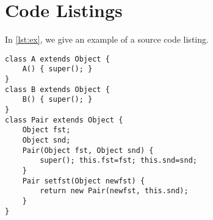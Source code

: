 \section{Code Listings}

In \vref{lst:ex}, we give an example of a source code listing. 

\begin{lstlisting}[style=Java,float=htb,caption={Java Source Code},label={lst:ex}]
class A extends Object {
	A() { super(); }
}
class B extends Object {
	B() { super(); }
}
class Pair extends Object {
	Object fst;
	Object snd;
	Pair(Object fst, Object snd) {
		super(); this.fst=fst; this.snd=snd;
	}
	Pair setfst(Object newfst) {
		return new Pair(newfst, this.snd);
	}
}
\end{lstlisting}
